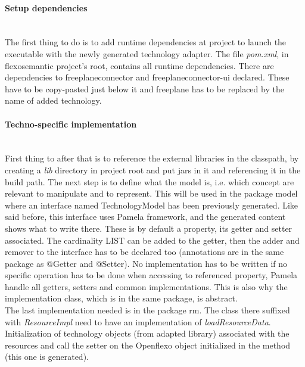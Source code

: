 \documentclass[9pt,a4paper]{article}
\begin{document}
		\paragraph{Setup dependencies}~\\
		The first thing to do is to add runtime dependencies at project to launch the executable with the newly generated technology adapter. The file \textit{pom.xml}, in flexosemantic project's root, contains all runtime dependencies. There are dependencies to freeplaneconnector and freeplaneconnector-ui declared. These have to be copy-pasted just below it and freeplane has to be replaced by the name of added technology.
		\paragraph{Techno-specific implementation}~\\
		First thing to after that is to reference the external libraries in the classpath, by creating a \textit{lib} directory in project root and put jars in it and referencing it in the build path. The next step is to define what the model is, i.e. which concept are relevant to manipulate and to represent. This will be used in the package model where an interface named TechnologyModel has been previously generated. Like said before, this interface uses Pamela framework, and the generated content shows what to write there. These is by default a property, its getter and setter associated. The cardinality LIST can be added to the getter, then the adder and remover to the interface has to be declared too (annotations are in the same package as @Getter and @Setter). No implementation has to be written if no specific operation has to be done when accessing to referenced property, Pamela handle all getters, setters and common implementations. This is also why the implementation class, which is in the same package, is abstract.\\
		The last implementation needed is in the package rm. The class there suffixed with \textit{ResourceImpl} need to have an implementation of \textit{loadResourceData}. Initialization of technology objects (from adapted library) associated with the resources and call the setter on the Openflexo object initialized in the method (this one is generated).
					
\end{document}
